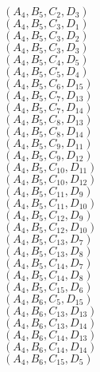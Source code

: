 \documentclass[14pt]{article}
\begin{document}
    $({A}_{4}, {B}_{5}, {C}_{2}, {D}_{3}) $ \\ 
    $({A}_{4}, {B}_{5}, {C}_{3}, {D}_{1}) $ \\ 
    $({A}_{4}, {B}_{5}, {C}_{3}, {D}_{2}) $ \\ 
    $({A}_{4}, {B}_{5}, {C}_{3}, {D}_{3}) $ \\ 
    $({A}_{4}, {B}_{5}, {C}_{4}, {D}_{5}) $ \\ 
    $({A}_{4}, {B}_{5}, {C}_{5}, {D}_{4}) $ \\ 
    $({A}_{4}, {B}_{5}, {C}_{6}, {D}_{15}) $ \\ 
    $({A}_{4}, {B}_{5}, {C}_{7}, {D}_{13}) $ \\ 
    $({A}_{4}, {B}_{5}, {C}_{7}, {D}_{14}) $ \\ 
    $({A}_{4}, {B}_{5}, {C}_{8}, {D}_{13}) $ \\ 
    $({A}_{4}, {B}_{5}, {C}_{8}, {D}_{14}) $ \\ 
    $({A}_{4}, {B}_{5}, {C}_{9}, {D}_{11}) $ \\ 
    $({A}_{4}, {B}_{5}, {C}_{9}, {D}_{12}) $ \\ 
    $({A}_{4}, {B}_{5}, {C}_{10}, {D}_{11}) $ \\ 
    $({A}_{4}, {B}_{5}, {C}_{10}, {D}_{12}) $ \\ 
    $({A}_{4}, {B}_{5}, {C}_{11}, {D}_{9}) $ \\ 
    $({A}_{4}, {B}_{5}, {C}_{11}, {D}_{10}) $ \\ 
    $({A}_{4}, {B}_{5}, {C}_{12}, {D}_{9}) $ \\ 
    $({A}_{4}, {B}_{5}, {C}_{12}, {D}_{10}) $ \\ 
    $({A}_{4}, {B}_{5}, {C}_{13}, {D}_{7}) $ \\ 
    $({A}_{4}, {B}_{5}, {C}_{13}, {D}_{8}) $ \\ 
    $({A}_{4}, {B}_{5}, {C}_{14}, {D}_{7}) $ \\ 
    $({A}_{4}, {B}_{5}, {C}_{14}, {D}_{8}) $ \\ 
    $({A}_{4}, {B}_{5}, {C}_{15}, {D}_{6}) $ \\ 
    $({A}_{4}, {B}_{6}, {C}_{5}, {D}_{15}) $ \\ 
    $({A}_{4}, {B}_{6}, {C}_{13}, {D}_{13}) $ \\ 
    $({A}_{4}, {B}_{6}, {C}_{13}, {D}_{14}) $ \\ 
    $({A}_{4}, {B}_{6}, {C}_{14}, {D}_{13}) $ \\ 
    $({A}_{4}, {B}_{6}, {C}_{14}, {D}_{14}) $ \\ 
    $({A}_{4}, {B}_{6}, {C}_{15}, {D}_{5}) $ \\ 
\end{document}
